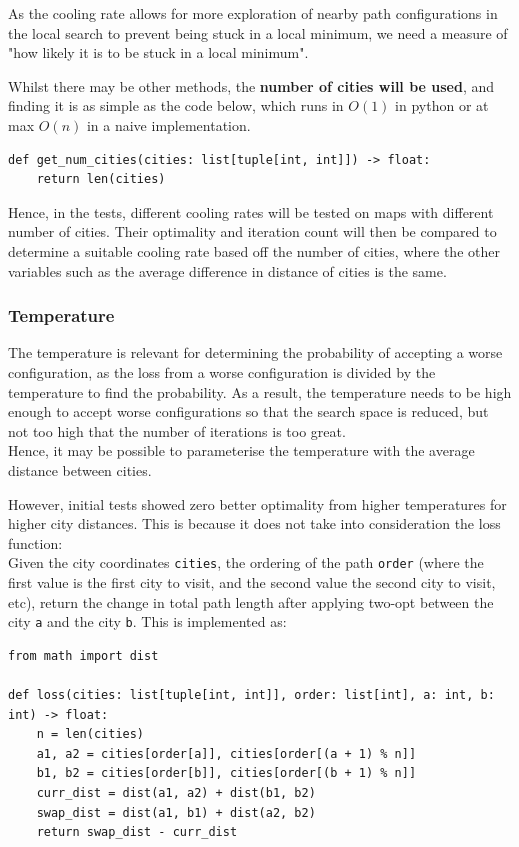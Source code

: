 \documentclass{article}
\begin{document}
As the cooling rate allows for more exploration of nearby path configurations in the local search to prevent being stuck in a local minimum, we need a measure of "how likely it is to be stuck in a local minimum".

Whilst there may be other methods, the \textbf{number of cities will be used}, and finding it is as simple as the code below, which runs in $O(1)$ in python or at max $O(n)$ in a naive implementation.

\begin{verbatim}
def get_num_cities(cities: list[tuple[int, int]]) -> float:
    return len(cities)
\end{verbatim}

Hence, in the tests, different cooling rates will be tested on maps with different number of cities.
Their optimality and iteration count will then be compared to determine a suitable cooling rate based off the number of cities, where the other variables such as the average difference in distance of cities is the same.

\subsubsection{Temperature}

The temperature is relevant for determining the probability of accepting a worse configuration, as the loss from a worse configuration is divided by the temperature to find the probability.
As a result, the temperature needs to be high enough to accept worse configurations so that the search space is reduced, but not too high that the number of iterations is too great.
\\

Hence, it may be possible to parameterise the temperature with the average distance between cities.

However, initial tests showed zero better optimality from higher temperatures for higher city distances.
This is because it does not take into consideration the loss function: 
\\
Given the city coordinates \texttt{cities}, the ordering of the path \texttt{order} (where the first value is the first city to visit, and the second value the second city to visit, etc), return the change in total path length after applying two-opt between the city \texttt{a} and the city \texttt{b}.
This is implemented as:

\begin{verbatim}
from math import dist

def loss(cities: list[tuple[int, int]], order: list[int], a: int, b: int) -> float:
    n = len(cities)
    a1, a2 = cities[order[a]], cities[order[(a + 1) % n]]
    b1, b2 = cities[order[b]], cities[order[(b + 1) % n]]
    curr_dist = dist(a1, a2) + dist(b1, b2)
    swap_dist = dist(a1, b1) + dist(a2, b2)
    return swap_dist - curr_dist
\end{verbatim}
\end{document}
